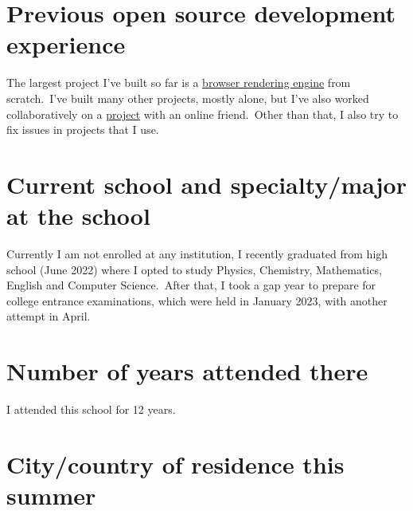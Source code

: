 \documentclass[11pt]{article}
\begin{document}


    \section{Previous open source development experience}
    \label{sec:previous-experience}

    The largest project I've built so far is a
    \href{https://github.com/sujaldev/skylon}{browser rendering engine} from scratch.\ I've built many other projects,
    mostly alone, but I've also worked collaboratively on a
    \href{https://github.com/aayush-tripathi/JEEPYQREPLYBOT}{project} with an online friend.\ Other than that, I also
    try to fix issues in projects that I use.




    \section{Current school and specialty/major at the school}
    \label{sec:educational-background}

    Currently I am not enrolled at any institution, I recently graduated from high school (June 2022) where I opted
    to study Physics, Chemistry, Mathematics, English and Computer Science.\ After that, I took a gap year to prepare
    for college entrance examinations, which were held in January 2023, with another attempt in April.




    \section{Number of years attended there}
    \label{sec:how-many-years-have-you-attended-there?}

    I attended this school for 12 years.




    \section{City/country of residence this summer}
    \label{sec:residence}
\end{document}
